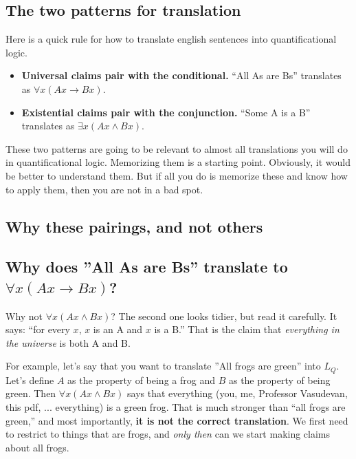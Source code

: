 \documentclass[11pt]{article}
\begin{document}
\subsection{The two patterns for translation}
Here is a quick rule for how to translate english sentences into quantificational logic. 


\begin{tcolorbox}[colback=boxyellow, colframe=orange!50!black, title={\textbf{The two patterns}}]
\begin{itemize}[leftmargin=*]
    \item \textbf{Universal claims pair with the conditional.} ``All As are Bs'' translates as $\forall x(Ax \to Bx)$.
    \item \textbf{Existential claims pair with the conjunction.} ``Some A is a B'' translates as $\exists x(Ax \wedge Bx)$.
\end{itemize}
\end{tcolorbox}

These two patterns are going to be relevant to almost all translations you will do in quantificational logic. Memorizing them is a starting point. Obviously, it would be better to understand them. But if all you do is memorize these and know how to apply them, then you are not in a bad spot.

\subsection{Why these pairings, and not others}

\subsection*{Why does ''All As are Bs'' translate to $\forall x(Ax \to Bx)$?} 

Why not $\forall x(Ax \wedge Bx)$? The second one looks tidier, but read it carefully. It says: ``for every $x$, $x$ is an A and $x$ is a B.'' That is the claim that \emph{everything in the universe} is both A and B. 

For example, let's say that you want to translate ''All frogs are green'' into $L_Q$. Let's define $A$ as the property of being a frog and $B$ as the property of being green. Then $\forall x(Ax \wedge Bx)$ says that everything (you, me, Professor Vasudevan, this pdf, ... everything) is a green frog. That is much stronger than ``all frogs are green,'' and most importantly, \textbf{it is not the correct translation}. We first need to restrict to things that are frogs, and \textit{only then} can we start making claims about all frogs. 
\end{document}
